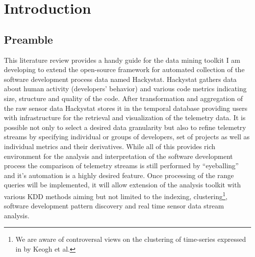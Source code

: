 \chapter{Introduction}
\section{Preamble}
This literature review provides a handy guide for the data mining toolkit I am developing to extend the open-source framework for automated collection of the software development process data named Hackystat. Hackystat gathers data about human activity (developers' behavior) and various code metrics indicating size, structure and quality of the code. After transformation and aggregation of the raw sensor data Hackystat stores it in the temporal database providing users with infrastructure for the retrieval and visualization of the telemetry data. It is possible not only to select a desired data granularity but also to refine telemetry streams by specifying individual or groups of developers, set of projects as well as individual metrics and their derivatives. While all of this provides rich environment for the analysis and interpretation of the software development process the comparison of telemetry streams is still performed by ``eyeballing'' and it's automation is a highly desired feature. Once processing of the range queries will be implemented, it will allow extension of the analysis toolkit with various KDD methods aiming but not limited to the indexing, clustering\footnote{We are aware of controversal views on the clustering of time-series expressed in \cite{citeulike:227029} by Keogh et al.}, software development pattern discovery and real time sensor data stream analysis.

